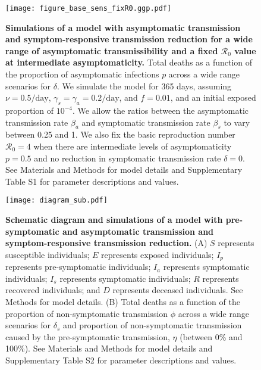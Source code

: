 \documentclass[12pt]{article}
\begin{document}
\pagebreak

\begin{figure}[!ht]
\begin{center}
\texttt{[image: figure\_base\_sens\_fixR0.ggp.pdf]}
\caption{
\textbf{Simulations of a model with asymptomatic transmission and symptom-responsive transmission reduction for a wide range of asymptomatic transmissibility and a fixed $\mathcal{R}_0$ value at intermediate asymptomaticity.}
Total deaths as a function of the proportion of asymptomatic infections $p$ across a wide range scenarios for $\delta$.
We simulate the model for 365 days, assuming $\nu=0.5/\mathrm{day}$, $\gamma_s=\gamma_a=0.2/\mathrm{day}$, and $f=0.01$, and an initial exposed proportion of $10^{-4}$.
We allow the ratios between the asymptomatic transmission rate $\beta_a$ and symptomatic transmission rate $\beta_s$ to vary between 0.25 and 1.
We also fix the basic reproduction number $\mathcal{R}_0=4$ when there are intermediate levels of asymptomaticity $p=0.5$ and no reduction in symptomatic transmission rate $\delta=0$.
See Materials and Methods for model details and Supplementary Table S1 for parameter descriptions and values.
}
\end{center}
\end{figure}


\pagebreak

\begin{figure}[!ht]
\begin{center}
\texttt{[image: diagram\_sub.pdf]}
\caption{
\textbf{Schematic diagram and simulations of a model with pre-symptomatic and asymptomatic transmission and symptom-responsive transmission reduction.}
(A) $S$ represents susceptible individuals; $E$ represents exposed individuals; $I_p$ represents pre-symptomatic individuals; $I_a$ represents symptomatic individuals; $I_s$ represents symptomatic individuals; $R$ represents recovered individuals; and $D$ represents deceased individuals. See Methods for model details.
(B) Total deaths as a function of the proportion of non-symptomatic transmission $\phi$ across a wide range scenarios for $\delta_s$ and proportion of non-symptomatic transmission caused by the pre-symptomatic transmission, $\eta$ (between 0\% and 100\%). 
See Materials and Methods for model details and Supplementary Table S2 for parameter descriptions and values.
}
\end{center}
\end{figure}

\pagebreak


\end{document}
